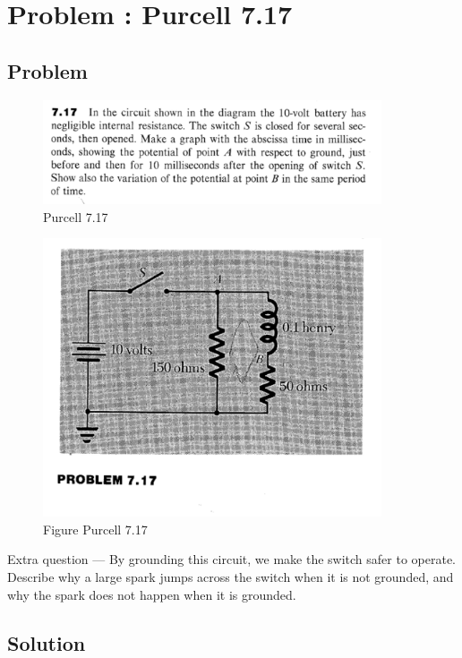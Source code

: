 \documentclass[solutions]{esg8022pset}
\date{\today }
\begin{document}
\section{Problem \thesection: Purcell 7.17}
\subsection{Problem}
\begin{figure}[H]
    \centering
    \includegraphics[width = 10cm]{pu717}
    \caption{Purcell 7.17}
  \end{figure}

  \begin{figure}[H]
    \centering
    \includegraphics[width = 10cm]{figpu717}
    \caption{Figure Purcell 7.17}
  \end{figure}

 Extra question --- By grounding this circuit, we make the switch
safer to operate. Describe why a large spark jumps across the switch
when it is not grounded, and why the spark does not happen when it is
grounded.
\subsection{Solution}
\end{document}
